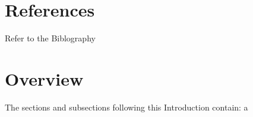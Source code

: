 
\section{References}

Refer to the Biblography


\section{Overview}

The sections and subsections following this Introduction contain:
a